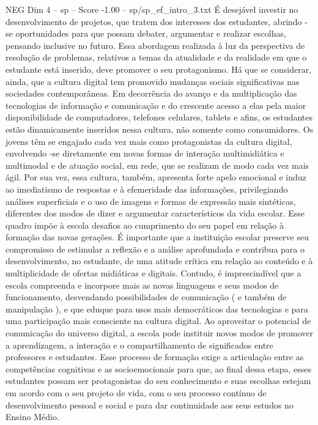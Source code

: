 \begin{textsample}{NEG Dim 4 – sp – Score -1.00 – sp/sp\_ef\_intro\_3.txt}
É desejável investir no desenvolvimento de projetos, que tratem dos interesses dos estudantes, abrindo -se oportunidades para que possam debater, argumentar e realizar escolhas, pensando inclusive no futuro.
Essa abordagem realizada à luz da perspectiva de resolução de problemas, relativos a temas da atualidade e da realidade em que o estudante está inserido, deve promover o seu protagonismo.
Há que se considerar, ainda, que a cultura digital tem promovido mudanças sociais significativas nas sociedades contemporâneas.
Em decorrência do avanço e da multiplicação das tecnologias de informação e comunicação e do crescente acesso a elas pela maior disponibilidade de computadores, telefones celulares, tablets e afins, os estudantes estão dinamicamente inseridos nessa cultura, não somente como consumidores.
Os jovens têm se engajado cada vez mais como protagonistas da cultura digital, envolvendo -se diretamente em novas formas de interação multimidiática e multimodal e de atuação social, em rede, que se realizam de modo cada vez mais ágil.
Por sua vez, essa cultura, também, apresenta forte apelo emocional e induz ao imediatismo de respostas e à efemeridade das informações, privilegiando análises superficiais e o uso de imagens e formas de expressão mais sintéticas, diferentes dos modos de dizer e argumentar característicos da vida escolar.
Esse quadro impõe à escola desafios ao cumprimento do seu papel em relação à formação das novas gerações.
É importante que a instituição escolar preserve seu compromisso de estimular a reflexão e a análise aprofundada e contribua para o desenvolvimento, no estudante, de uma atitude crítica em relação ao conteúdo e à multiplicidade de ofertas midiáticas e digitais.
Contudo, é imprescindível que a escola compreenda e incorpore mais as novas linguagens e seus modos de funcionamento, desvendando possibilidades de comunicação ( e também de manipulação ), e que eduque para usos mais democráticos das tecnologias e para uma participação mais consciente na cultura digital.
Ao aproveitar o potencial de comunicação do universo digital, a escola pode instituir novos modos de promover a aprendizagem, a interação e o compartilhamento de significados entre professores e estudantes.
Esse processo de formação exige a articulação entre as competências cognitivas e as socioemocionais para que, ao final dessa etapa, esses estudantes possam ser protagonistas do seu conhecimento e suas escolhas estejam em acordo com o seu projeto de vida, com o seu processo contínuo de desenvolvimento pessoal e social e para dar continuidade aos seus estudos no Ensino Médio.

\end{textsample}
